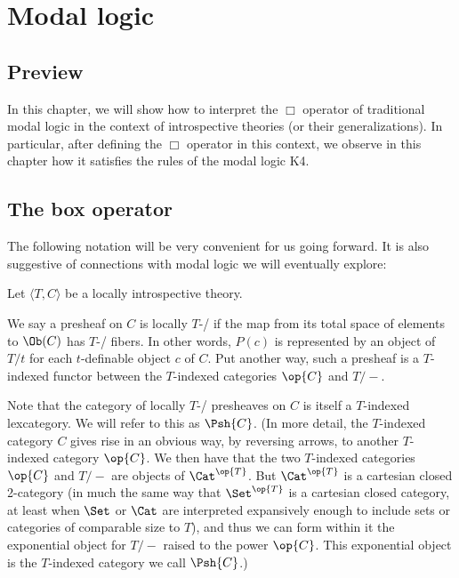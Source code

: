 \filestart

\section{Modal logic}
\subsection{Preview}
In this chapter, we will show how to interpret the $\Box$ operator of traditional modal logic in the context of introspective theories (or their generalizations). In particular, after defining the $\Box$ operator in this context, we observe in this chapter how it satisfies the rules of the modal logic K4.

\subsection{The box operator}
The following notation will be very convenient for us going forward. It is also suggestive of connections with modal logic we will eventually explore:

Let $\langle T, C \rangle$ be a locally introspective theory.


We say a presheaf on $C$ is locally $T$-\repsmall/ if the map from its total space of elements to $\Ob(C)$ has $T$-\repsmall/ fibers. In other words, $P(c)$ is represented by an object of $T/t$ for each $t$-definable object $c$ of $C$. Put another way, such a presheaf is a $T$-indexed functor between the $T$-indexed categories $\op{C}$ and $T/-$.

Note that the category of locally $T$-\repsmall/ presheaves on $C$ is itself a $T$-indexed lexcategory. We will refer to this as $\Psh{C}$. (In more detail, the $T$-indexed category $C$ gives rise in an obvious way, by reversing arrows, to another $T$-indexed category $\op{C}$. We then have that the two $T$-indexed categories $\op{C}$ and $T/-$ are objects of $\Cat^{\op{T}}$. But $\Cat^{\op{T}}$ is a cartesian closed 2-category (in much the same way that $\Set^{\op{T}}$ is a cartesian closed category, at least when $\Set$ or $\Cat$ are interpreted expansively enough to include sets or categories of comparable size to $T$), and thus we can form within it the exponential object for $T/-$ raised to the power $\op{C}$. This exponential object is the $T$-indexed category we call $\Psh{C}$.)

